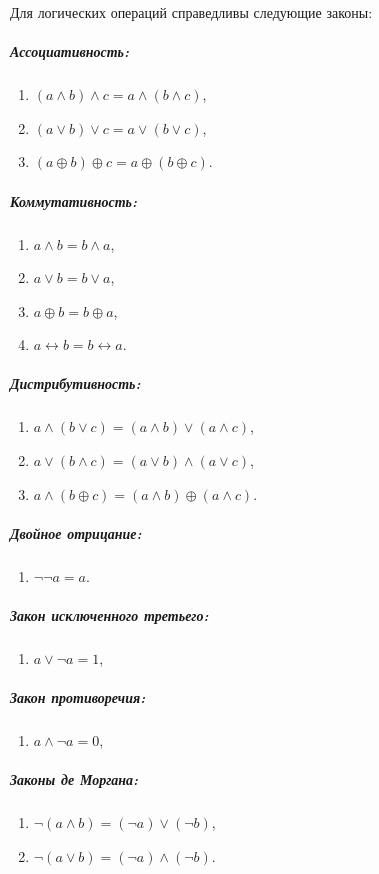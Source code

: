 \begin{thm} Для логических операций справедливы следующие законы:

\subparagraph{Ассоциативность:}
\begin{enumerate}
\item $(a \land b) \land c = a \land (b \land c)$,
\item $(a \lor b) \lor c = a \lor (b \lor c)$,
\item $(a \oplus b) \oplus c = a \oplus (b \oplus c)$.
\end{enumerate}

\subparagraph{Коммутативность:}
\begin{enumerate}
\item $a \land b = b \land a$,
\item $a \lor b = b \lor a$,
\item $a \oplus b = b \oplus a$,
\item $a \leftrightarrow b = b \leftrightarrow a$.
\end{enumerate}

\subparagraph{Дистрибутивность:}
\begin{enumerate}
\item $a \land (b \lor c) = (a \land b) \lor (a \land c)$,
\item $a \lor (b \land c) = (a \lor b) \land (a \lor c)$,
\item $a \land (b \oplus c) = (a \land b) \oplus (a \land c)$.
\end{enumerate}

\subparagraph{Двойное отрицание:}
\begin{enumerate}
\item $\neg\neg a = a$.
\end{enumerate}

\subparagraph{Закон исключенного третьего:}
\begin{enumerate}
\item $a \lor \neg a = 1$,
\end{enumerate}

\subparagraph{Закон противоречия:}
\begin{enumerate}
\item $a \land \neg a = 0$,
\end{enumerate}

\subparagraph{Законы де Моргана:}
\begin{enumerate}
\item $\neg (a \land b) = (\neg a) \lor (\neg b)$,
\item $\neg (a \lor b) = (\neg a) \land (\neg b)$.
\end{enumerate}


\end{thm}
